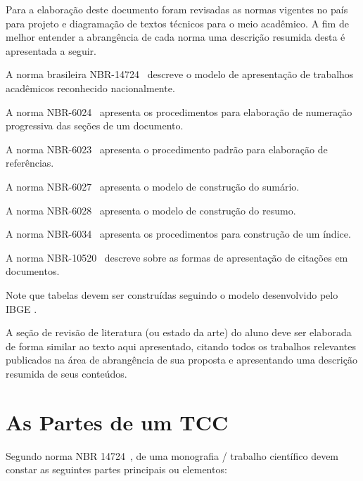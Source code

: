 \documentclass[repeatfields,xlists,xpacks,oneside,yearsonly]{ufrgscca}
\begin{document}
Para a elaboração deste documento foram revisadas as normas vigentes no país
para projeto e diagramação de textos técnicos para o meio acadêmico. A fim
de melhor entender a abrangência de cada norma uma descrição resumida desta
é apresentada a seguir.

A norma brasileira NBR-14724~\cite{ABNT:NBR-14724-2011} descreve o modelo de
apresentação de trabalhos acadêmicos reconhecido nacionalmente.

A norma NBR-6024~\cite{ABNT:NBR-6024-2003}  apresenta os procedimentos para
elaboração de numeração progressiva das seções de um documento.

A norma  NBR-6023~\cite{ABNT:NBR-6023-2002} apresenta o procedimento padrão
para elaboração de referências.

A norma NBR-6027~\cite{ABNT:NBR-6027-2003} apresenta o modelo de construção do sumário.

A norma NBR-6028~\cite{ABNT:NBR-6028-2003} apresenta o modelo de construção do resumo.

A norma NBR-6034~\cite{ABNT:NBR-6034-2004} apresenta os procedimentos para construção de um índice.

A norma NBR-10520~\cite{ABNT:NBR-10520-2002} descreve sobre as
formas de apresentação de citações em documentos.


Note que tabelas devem ser construídas seguindo o modelo desenvolvido pelo IBGE \cite{IBGE:tabular-1993}.


A seção de revisão de literatura (ou estado da arte) do aluno deve ser
elaborada de forma similar ao texto aqui apresentado, citando todos os
trabalhos relevantes publicados na área de abrangência de sua proposta e
apresentando uma descrição resumida de seus conteúdos.

\chapter{As Partes de um TCC}
\label{partes}


Segundo norma NBR 14724~\cite{ABNT:NBR-14724-2011},
de uma monografia / trabalho científico devem constar as seguintes partes principais ou
elementos:
\end{document}

